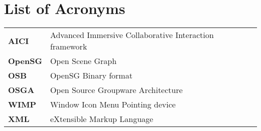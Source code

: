 \chapter*{List of Acronyms}

\begin{tabular}{ll}

\textbf{AICI} & Advanced Immersive Collaborative Interaction framework \\

\textbf{OpenSG} & Open Scene Graph \\

\textbf{OSB} & OpenSG Binary format \\

\textbf{OSGA} & Open Source Groupware Architecture \\

\textbf{WIMP} & Window Icon Menu Pointing device \\

\textbf{XML} & eXtensible Markup Language \\

\end{tabular}
